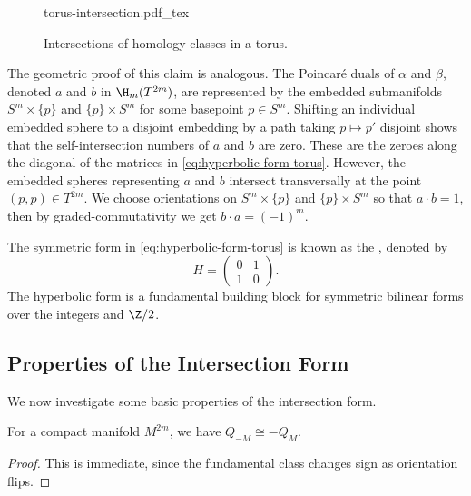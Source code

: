 \begin{figure}[ht]
	\centering
	{torus-intersection.pdf_tex}
	\caption{Intersections of homology classes in a torus.}\label{fig:geometric-intersection-torus} 
\end{figure}

The geometric proof of this claim is analogous. The Poincar\'e duals of $\alpha$ and $\beta$, denoted $a$ and $b$ in $\H_{m}(T^{2m})$, are represented
by the embedded submanifolds $S^m\times \{p\}$ and $\{p\}\times S^m$ for some basepoint $p\in S^m$. Shifting an individual embedded sphere to a disjoint embedding by a path taking $p\mapsto p'$ disjoint shows that the self-intersection numbers of $a$ and $b$ are zero. These are the zeroes along the diagonal of the matrices in \cref{eq:hyperbolic-form-torus}. However, the embedded spheres representing $a$ and $b$ intersect transversally at the point $(p,p)\in T^{2m}$. We choose orientations on $S^m\times \{p\}$ and $\{p\}\times S^m$ so that $a\cdot b=1$, then by graded-commutativity we get $b\cdot a=(-1)^m$.

\begin{remark}
	The symmetric form in \cref{eq:hyperbolic-form-torus} is known as the , denoted by
	\[
		H=\begin{pmatrix} 0 & 1\\ 1 & 0 \end{pmatrix}.
	\]
	The hyperbolic form is a fundamental building block for symmetric bilinear forms over the integers and $\Z/2$.
\end{remark}

\subsection{Properties of the Intersection Form}
We now investigate some basic properties of the intersection form.

\begin{proposition}\label{prop:orientation-intersection-form}
	For a compact manifold $M^{2m}$, we have
	$Q_{-M} \cong -Q_{M}$.
\end{proposition}
\begin{proof}
	This is immediate, since the fundamental class changes sign as orientation flips.
\end{proof}

